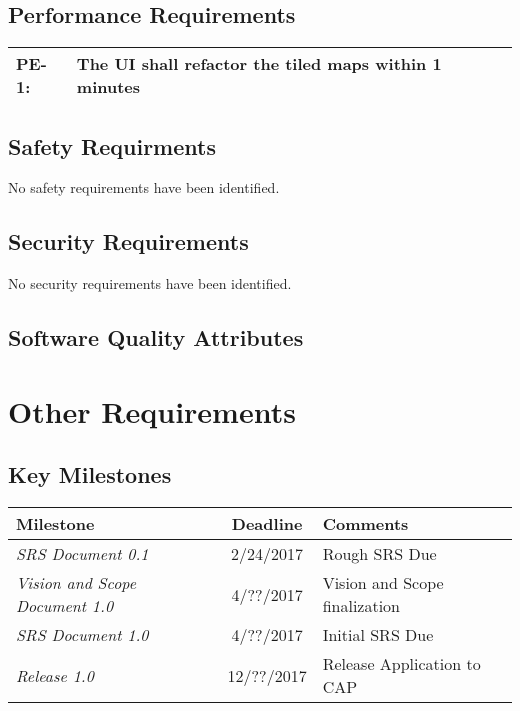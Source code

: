 \documentclass[12pt, letterpaper]{article}
\begin{document}
  \subsection{Performance Requirements}
    \begin{tabularx}{\textwidth}{|l|X|}
      \hline
      PE-1: & The UI shall refactor the tiled maps within 1 minutes\\ \hline
    \end{tabularx}

  \subsection{Safety Requirments}
  No safety requirements have been identified.
  \subsection{Security Requirements}
  No security requirements have been identified.
  \subsection{Software Quality Attributes}

\section{Other Requirements}
  \subsection{Key Milestones}
  \begin{tabularx}{\textwidth}{l c l}
    \hline
    \textbf{Milestone} & \textbf{Deadline} & \textbf{Comments}\\
    \hline
    \textit{SRS Document 0.1} & 2/24/2017 & Rough SRS Due \\
    \textit{Vision and Scope Document 1.0} & 4/??/2017 & Vision and Scope finalization \\
    \textit{SRS Document 1.0} & 4/??/2017 & Initial SRS Due \\
    \textit{Release 1.0} & 12/??/2017 & Release Application to CAP \\
    \hline
  \end{tabularx}
\appendix
\end{document}
